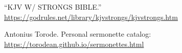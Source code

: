 {\footnotesize
\begin{thebibliography}{99}
	
	 ``KJV W/ STRONGS BIBLE.'' \url{https://godrules.net/library/kjvstrongs/kjvstrongs.htm}
	
	 Antonius Torode. Personal sermonette catalog: \url{https://torodean.github.io/sermonettes.html}
	
\end{thebibliography}
}